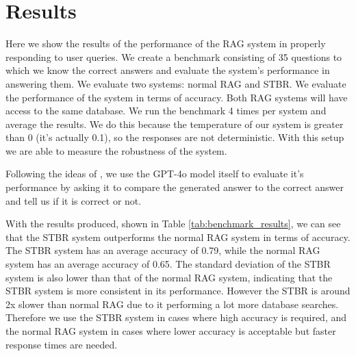 \documentclass[a4paper,12pt,twoside]{ThesisStyle}
\begin{document}
\chapter{Results}
\label{cap:results}

Here we show the results of the performance of the RAG system in properly responding to user queries. We create a benchmark consisting of 35 questions to which we know the correct answers and evaluate the system's performance in answering them. We evaluate two systems: normal RAG and STBR. We evaluate the performance of the system in terms of accuracy. Both RAG systems will have access to the same database. We run the benchmark 4 times per system and average the results. We do this because the temperature of our system is greater than 0 (it's actually 0.1), so the responses are not deterministic. With this setup we are able to measure the robustness of the system.

Following the ideas of \cite{Es2023RagasAutomatedEvaluationRetrieval}, we use the GPT-4o model itself to evaluate it's performance by asking it to compare the generated answer to the correct answer and tell us if it is correct or not.

With the results produced, shown in Table \ref{tab:benchmark_results}, we can see that the STBR system outperforms the normal RAG system in terms of accuracy. The STBR system has an average accuracy of 0.79, while the normal RAG system has an average accuracy of 0.65. The standard deviation of the STBR system is also lower than that of the normal RAG system, indicating that the STBR system is more consistent in its performance. However the STBR is around 2x slower than normal RAG due to it performing a lot more database searches. Therefore we use the STBR system in cases where high accuracy is required, and the normal RAG system in cases where lower accuracy is acceptable but faster response times are needed.
\end{document}
